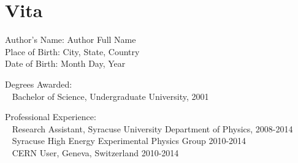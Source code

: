

\clearpage
\vspace*{3cm}
{}
\section*{Vita}
Author's Name: \hfill Author Full Name\\
Place of Birth: \hfill City, State, Country\\
Date of Birth: \hfill Month Day, Year

Degrees Awarded:\\[0pt]
\mbox{}~ \hfill Bachelor of Science, Undergraduate University, 2001

Professional Experience:\\[0pt]
{\singlespacing
\mbox{}~ \hfill Research Assistant, Syracuse University Department of Physics, 2008-2014\\[0pt]
\mbox{}~ \hfill {\small Syracuse High Energy Experimental Physics Group 2010-2014}\hspace*{1cm}\\[0pt]
\mbox{}~ \hfill {\small CERN User, Geneva, Switzerland 2010-2014}\hspace*{1cm}\\[0pt]
}
